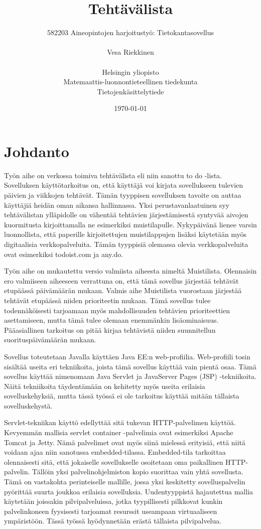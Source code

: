 \documentclass[12pt,a4paper,oneside,titlepage,pdftex]{article}
\title{Tehtävälista}
\date{\today}
\author{582203 Aineopintojen harjoitustyö: Tietokantasovellus\\ \\ Vesa Riekkinen\\ \\Helsingin yliopisto\\Matemaattis-luonnontieteellinen tiedekunta\\Tietojenkäsittelytiede}
\begin{document}
\maketitle

\setcounter{page}{1}
 
\section{Johdanto}

Työn aihe on verkossa toimiva tehtävälista eli niin sanottu to do -lista. Sovelluksen käyttötarkoitus on, että käyttäjä voi kirjata sovellukseen tulevien päivien ja viikkojen tehtävät. Tämän tyyppisen sovelluksen tavoite on auttaa käyttäjiä heidän oman aikansa hallinnassa. Yksi perustavanlaatuinen syy tehtävälistan ylläpidolle on vähentää tehtävien järjestämisestä syntyvää aivojen kuormitusta kirjoittamalla ne esimerkiksi muistilapulle. Nykypäivänä lienee varsin luonnollista, että paperille kirjoitettujen muistilappujen lisäksi käytetään myös digitaalisia verkkopalveluita. Tämän tyyppisiä olemassa olevia verkkopalveluita ovat esimerkiksi todoist.com ja any.do.

Työn aihe on mukautettu versio valmiista aiheesta nimeltä Muistilista. Olennaisin ero valmiiseen aiheeseen verrattuna on, että tämä sovellus järjestää tehtävät etupäässä päivämäärän mukaan. Valmis aihe Muistilista vuorostaan järjestää tehtävät etupäässä niiden prioriteetin mukaan. Tämä sovellus tulee todennäköisesti tarjoamaan myös mahdollisuuden tehtävien prioriteettien asettamiseen, mutta tämä tulee olemaan enemmänkin lisäominaisuus. Pääasiallinen tarkoitus on pitää kirjaa tehtävistä niiden suunnitellun suorituspäivämäärän mukaan.

Sovellus toteutetaan Javalla käyttäen Java EE:n web-profiilia. Web-profiili tosin sisältää useita eri tekniikoita, joista tämä sovellus käyttää vain pientä osaa. Tämä sovellus käyttää nimenomaan Java Servlet ja JavaServer Pages (JSP) -tekniikoita. Näitä tekniikoita täydentämään on kehitetty myös useita erilaisia sovelluskehyksiä, mutta tässä työssä ei ole tarkoitus käyttää mitään tällaista sovelluskehystä.

Servlet-tekniikan käyttö edellyttää sitä tukevan HTTP-palvelimen käyttöä. Kevyemmän mallisia servlet container -palvelimia ovat esimerkiksi Apache Tomcat ja Jetty. Nämä palvelimet ovat myös siinä mielessä erityisiä, että niitä voidaan ajaa niin sanotussa embedded-tilassa. Embedded-tila tarkoittaa olennaisesti sitä, että jokaiselle sovellukselle osoitetaan oma paikallinen HTTP-palvelin. Tällöin yksi palvelinohjelmiston kopio suorittaa vain yhtä sovellusta. Tämä on vastakohta perinteiselle mallille, jossa yksi keskitetty sovelluspalvelin pyörittää suurta joukkoa erilaisia sovelluksia. Uudentyyppistä hajautettua mallia käytetään joissakin pilvipalveluissa, jotka tyypillisesti pilkkovat kunkin palvelinkoneen fyysisesti tarjoamat resurssit useampaan virtuaaliseen ympäristöön. Tässä työssä hyödynnetään erästä tällaista pilvipalvelua.
\end{document}
